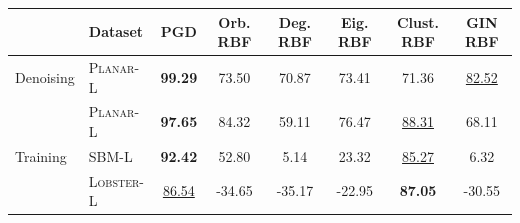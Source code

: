 \begin{tabular}{llcccccc}
\toprule
 & \textbf{Dataset} & \textbf{PGD} & \textbf{Orb. RBF} & \textbf{Deg. RBF} & \textbf{Eig. RBF} & \textbf{Clust. RBF} & \textbf{GIN RBF} \\
\midrule
Denoising & \textsc{Planar-L} & \textbf{99.29} & 73.50 & 70.87 & 73.41 & 71.36 & \underline{82.52} \\
\midrule
\multirow{3}{*}{Training} & \textsc{Planar-L} & \textbf{97.65} & 84.32 & 59.11 & 76.47 & \underline{88.31} & 68.11 \\
 & \textsc{SBM-L} & \textbf{92.42} & 52.80 & 5.14 & 23.32 & \underline{85.27} & 6.32 \\
 & \textsc{Lobster-L} & \underline{86.54} & -34.65 & -35.17 & -22.95 & \textbf{87.05} & -30.55 \\
\bottomrule
\end{tabular}